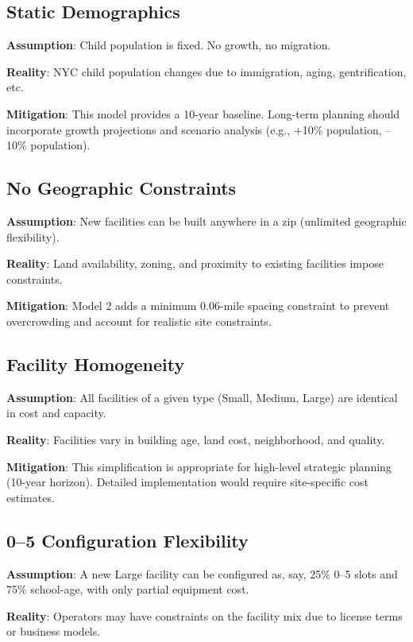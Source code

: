 \documentclass[12pt]{article}
\begin{document}
\subsection{Static Demographics}

\textbf{Assumption}: Child population is fixed. No growth, no migration.

\textbf{Reality}: NYC child population changes due to immigration, aging, gentrification, etc.

\textbf{Mitigation}: This model provides a 10-year baseline. Long-term planning should incorporate growth projections 
and scenario analysis (e.g., +10\% population, --10\% population).

\subsection{No Geographic Constraints}

\textbf{Assumption}: New facilities can be built anywhere in a zip (unlimited geographic flexibility).

\textbf{Reality}: Land availability, zoning, and proximity to existing facilities impose constraints.

\textbf{Mitigation}: Model 2 adds a minimum 0.06-mile spacing constraint to prevent overcrowding and 
account for realistic site constraints.

\subsection{Facility Homogeneity}

\textbf{Assumption}: All facilities of a given type (Small, Medium, Large) are identical in cost and capacity.

\textbf{Reality}: Facilities vary in building age, land cost, neighborhood, and quality.

\textbf{Mitigation}: This simplification is appropriate for high-level strategic planning (10-year horizon). 
Detailed implementation would require site-specific cost estimates.

\subsection{0--5 Configuration Flexibility}

\textbf{Assumption}: A new Large facility can be configured as, say, 25\% 0--5 slots and 75\% school-age, 
with only partial equipment cost.

\textbf{Reality}: Operators may have constraints on the facility mix due to license terms or business models.
\end{document}

